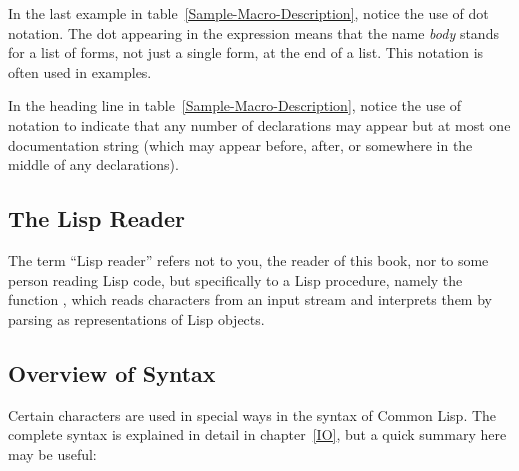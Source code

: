 In the last example in table~\ref{Sample-Macro-Description}, notice the
use of dot notation.  The dot appearing in the expression
 means that the name \emph{body} stands
for a list of forms, not just a single form, at the end of a list.  This
notation is often used in examples.

In the heading line in table~\ref{Sample-Macro-Description}, notice the
use of \Mchoice{~} notation to indicate that any number of declarations
may appear but at most one documentation string (which may appear before,
after, or somewhere in the middle of any declarations).

\subsection{The Lisp Reader}

The term ``Lisp reader'' refers not to you, the reader of this book,
nor to some person reading Lisp code, but specifically
to a Lisp procedure, namely the function ,
which reads characters from an input stream and interprets them by parsing
as representations of Lisp objects.

\subsection{Overview of Syntax}

Certain characters are used in special ways in the syntax of Common Lisp.
The complete syntax is explained in detail in chapter~\ref{IO},
but a quick summary here may be useful:

